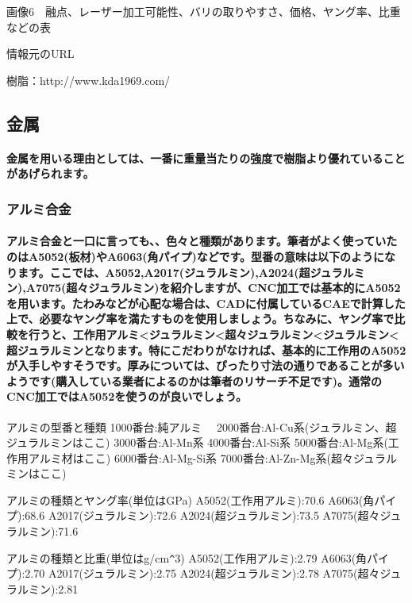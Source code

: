 \documentclass[b5paper, 9pt, twocolumn, titlepage]{jsbook}%
\begin{document}
画像6　融点、レーザー加工可能性、バリの取りやすさ、価格、ヤング率、比重などの表

情報元のURL

樹脂：http://www.kda1969.com/

\subsection{金属}

\paragraph{金属を用いる理由としては、一番に重量当たりの強度で樹脂より優れていることがあげられます。}

\subsubsection{アルミ合金}

\paragraph{アルミ合金と一口に言っても、、色々と種類があります。筆者がよく使っていたのはA5052(板材)やA6063(角パイプ)などです。型番の意味は以下のようになります。ここでは、A5052,A2017(ジュラルミン),A2024(超ジュラルミン),A7075(超々ジュラルミン)を紹介しますが、CNC加工では基本的にA5052を用います。たわみなどが心配な場合は、CADに付属しているCAEで計算した上で、必要なヤング率を満たすものを使用しましょう。ちなみに、ヤング率で比較を行うと、工作用アルミ<ジュラルミン<超々ジュラルミン<ジュラルミン<超ジュラルミンとなります。特にこだわりがなければ、基本的に工作用のA5052が入手しやすそうです。厚みについては、ぴったり寸法の通りであることが多いようです(購入している業者によるのかは筆者のリサーチ不足です)。通常のCNC加工ではA5052を使うのが良いでしょう。}

アルミの型番と種類
1000番台:純アルミ　
2000番台:Al-Cu系(ジュラルミン、超ジュラルミンはここ)
3000番台:Al-Mn系
4000番台:Al-Si系
5000番台:Al-Mg系(工作用アルミ材はここ)
6000番台:Al-Mg-Si系
7000番台:Al-Zn-Mg系(超々ジュラルミンはここ)

アルミの種類とヤング率(単位はGPa)
A5052(工作用アルミ):70.6
A6063(角パイプ):68.6
A2017(ジュラルミン):72.6
A2024(超ジュラルミン):73.5
A7075(超々ジュラルミン):71.6

アルミの種類と比重(単位はg/cm\verb|^|3)
A5052(工作用アルミ):2.79
A6063(角パイプ):2.70
A2017(ジュラルミン):2.75
A2024(超ジュラルミン):2.78
A7075(超々ジュラルミン):2.81
\end{document}
